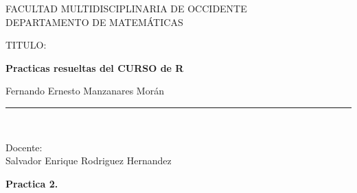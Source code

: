 \documentclass{article}
\begin{document}

\begin{titlepage}

\begin{center}
\vspace*{-1in}
\begin{figure}[htb]
\begin{center}
\end{center}
\end{figure}

FACULTAD MULTIDISCIPLINARIA DE OCCIDENTE\\
\vspace*{0.15in}
DEPARTAMENTO DE MATEMÁTICAS \\
\vspace*{0.6in}
\begin{large}
TITULO:\\
\end{large}
\vspace*{0.2in}
\begin{Large}
\textbf{Practicas resueltas del CURSO de R} \\
\end{Large}
\vspace*{0.3in}
\begin{large}
Fernando Ernesto Manzanares Morán\\
\end{large}
\vspace*{0.3in}
\rule{80mm}{0.1mm}\\
\vspace*{0.1in}
\begin{large}
Docente: \\
Salvador Enrique Rodriguez Hernandez \\
\end{large}
\end{center}

\end{titlepage}
\newpage
\textbf{Practica 2.}
\end{document}
